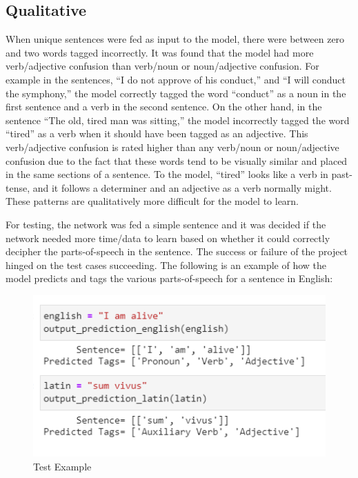 \documentclass[conference]{IEEEtran}
\begin{document}
\subsection{Qualitative}
When unique sentences were fed as input to the model, there were between zero and two words tagged incorrectly. It was found that the model had more verb/adjective confusion than verb/noun or noun/adjective confusion. For example in the sentences, “I do not approve of his conduct,” and “I will conduct the symphony,” the model correctly tagged the word “conduct” as a noun in the first sentence and a verb in the second sentence. On the other hand, in the sentence “The old, tired man was sitting,” the model incorrectly tagged the word “tired” as a verb when it should have been tagged as an adjective. This verb/adjective confusion is rated higher than any verb/noun or noun/adjective confusion due to the fact that these words tend to be visually similar and placed in the same sections of a sentence. To the model, “tired” looks like a verb in past-tense, and it follows a determiner and an adjective as a verb normally might. These patterns are qualitatively more difficult for the model to learn.

For testing, the network was fed a simple sentence and it was decided if the network needed more time/data to learn based on whether it could correctly decipher the parts-of-speech in the sentence. The success or failure of the project hinged on the test cases succeeding.
The following is an example of how the model predicts and tags the various parts-of-speech for a sentence in English:

\begin{figure}[htbp]
\centerline{\includegraphics[width=\linewidth]{iamalive.PNG}}
\caption{Test Example}
\label{fig4}
\end{figure}  
\end{document}
